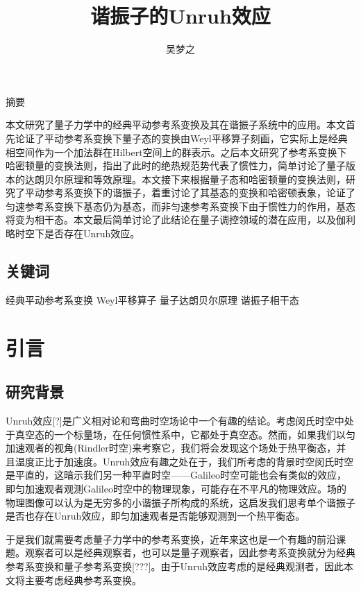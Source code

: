 \documentclass[a4paper]{article}
\title{谐振子的Unruh效应}
\author{吴梦之}
\begin{document}
    \maketitle

    \begin{center}
        \fontsize{18pt}{0}摘\quad\quad 要
    \end{center}

        本文研究了量子力学中的经典平动参考系变换及其在谐振子系统中的应用。本文首先论证了平动参考系变换下量子态的变换由Weyl平移算子刻画，它实际上是经典相空间作为一个加法群在Hilbert空间上的群表示。之后本文研究了参考系变换下哈密顿量的变换法则，指出了此时的绝热规范势代表了惯性力，简单讨论了量子版本的达朗贝尔原理和等效原理。本文接下来根据量子态和哈密顿量的变换法则，研究了平动参考系变换下的谐振子，着重讨论了其基态的变换和哈密顿表象，论证了匀速参考系变换下基态仍为基态，而非匀速参考系变换下由于惯性力的作用，基态将变为相干态。本文最后简单讨论了此结论在量子调控领域的潜在应用，以及伽利略时空下是否存在Unruh效应。

    \subsection*{关键词} 经典平动参考系变换    Weyl平移算子    量子达朗贝尔原理    谐振子相干态



    \section{引言}

    \subsection{研究背景}

        Unruh效应[?]是广义相对论和弯曲时空场论中一个有趣的结论。考虑闵氏时空中处于真空态的一个标量场，在任何惯性系中，它都处于真空态。然而，如果我们以匀加速观者的视角(Rindler时空)来考察它，我们将会发现这个场处于热平衡态，并且温度正比于加速度。Unruh效应有趣之处在于，我们所考虑的背景时空闵氏时空是平直的，这暗示我们另一种平直时空——Galileo时空可能也会有类似的效应，即匀加速观者观测Galileo时空中的物理现象，可能存在不平凡的物理效应。场的物理图像可以认为是无穷多的小谐振子所构成的系统，这启发我们思考单个谐振子是否也存在Unruh效应，即匀加速观者是否能够观测到一个热平衡态。

        于是我们就需要考虑量子力学中的参考系变换，近年来这也是一个有趣的前沿课题。观察者可以是经典观察者，也可以是量子观察者，因此参考系变换就分为经典参考系变换和量子参考系变换[???]。由于Unruh效应考虑的是经典观测者，因此本文将主要考虑经典参考系变换。
\end{document}
